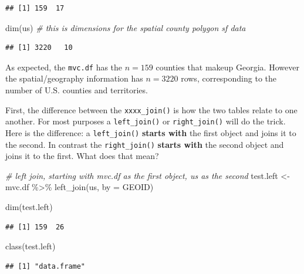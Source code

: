 \documentclass[
]{book}
\newenvironment{Shaded}{\begin{snugshade}}{\end{snugshade}}
\newcommand{\AttributeTok}[1]{\textcolor[rgb]{0.77,0.63,0.00}{#1}}
\newcommand{\CommentTok}[1]{\textcolor[rgb]{0.56,0.35,0.01}{\textit{#1}}}
\newcommand{\FunctionTok}[1]{\textcolor[rgb]{0.00,0.00,0.00}{#1}}
\newcommand{\NormalTok}[1]{#1}
\newcommand{\OtherTok}[1]{\textcolor[rgb]{0.56,0.35,0.01}{#1}}
\newcommand{\SpecialCharTok}[1]{\textcolor[rgb]{0.00,0.00,0.00}{#1}}
\newcommand{\StringTok}[1]{\textcolor[rgb]{0.31,0.60,0.02}{#1}}
\begin{document}
\begin{verbatim}
## [1] 159  17
\end{verbatim}

\begin{Shaded}
\begin{Highlighting}[]
\FunctionTok{dim}\NormalTok{(us)      }\CommentTok{\# this is dimensions for the spatial county polygon sf data}
\end{Highlighting}
\end{Shaded}

\begin{verbatim}
## [1] 3220   10
\end{verbatim}

As expected, the \texttt{mvc.df} has the \(n=159\) counties that makeup Georgia. However the spatial/geography information has \(n=3220\) rows, corresponding to the number of U.S. counties and territories.

First, the difference between the \texttt{xxxx\_join()} is how the two tables relate to one another. For most purposes a \texttt{left\_join()} or \texttt{right\_join()} will do the trick. Here is the difference: a \texttt{left\_join()} \textbf{starts with} the first object and joins it to the second. In contrast the \texttt{right\_join()} \textbf{starts with} the second object and joins it to the first. What does that mean?

\begin{Shaded}
\begin{Highlighting}[]
\CommentTok{\# left join, starting with mvc.df as the first object, us as the second}
\NormalTok{test.left }\OtherTok{\textless{}{-}}\NormalTok{ mvc.df }\SpecialCharTok{\%\textgreater{}\%}
  \FunctionTok{left\_join}\NormalTok{(us, }\AttributeTok{by =} \StringTok{\textquotesingle{}GEOID\textquotesingle{}}\NormalTok{)}

\FunctionTok{dim}\NormalTok{(test.left)}
\end{Highlighting}
\end{Shaded}

\begin{verbatim}
## [1] 159  26
\end{verbatim}

\begin{Shaded}
\begin{Highlighting}[]
\FunctionTok{class}\NormalTok{(test.left)}
\end{Highlighting}
\end{Shaded}

\begin{verbatim}
## [1] "data.frame"
\end{verbatim}
\end{document}

